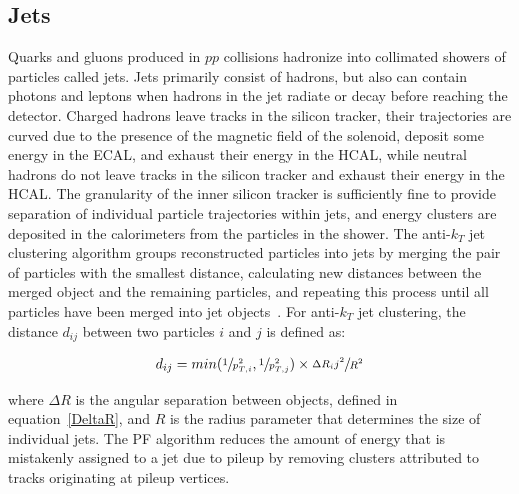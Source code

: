 \subsection{Jets}
Quarks and gluons produced in $pp$ collisions hadronize into collimated showers of particles called jets.
Jets primarily consist of hadrons, but also can contain photons and leptons when hadrons in the jet radiate or decay before reaching the detector.
Charged hadrons leave tracks in the silicon tracker, their trajectories are curved due to the presence of the magnetic field of the solenoid, deposit some energy in the ECAL, and exhaust their energy in the HCAL, while neutral hadrons do not leave tracks in the silicon tracker and exhaust their energy in the HCAL.
The granularity of the inner silicon tracker is sufficiently fine to provide separation of individual particle trajectories within jets, and energy clusters are deposited in the calorimeters from the particles in the shower.
The anti-$k_T$ jet clustering algorithm groups reconstructed particles into jets by merging the pair of particles with the smallest distance, calculating new distances between the merged object and the remaining particles, and repeating this process until all particles have been merged into jet objects~\cite{Matteo_Cacciari_2008}.
For anti-$k_T$ jet clustering, the distance $d_{ij}$ between two particles $i$ and $j$ is defined as:
\begin{linenomath*}
\begin{align}
d_{ij} = min(\sfrac{1}{p_{T,i}^2}, \sfrac{1}{p_{T,j}^2}) \times \sfrac{{\Delta R_ij}^2}{R^2}
\end{align}
\end{linenomath*}
where $\Delta R$ is the angular separation between objects, defined in equation~\ref{DeltaR}, and $R$ is the radius parameter that determines the size of individual jets.
The PF algorithm reduces the amount of energy that is mistakenly assigned to a jet due to pileup by removing clusters attributed to tracks originating at pileup vertices.


